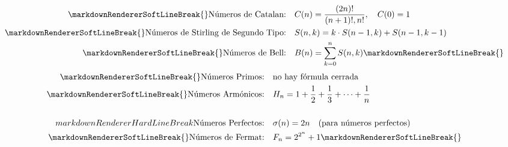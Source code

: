 {}
\markdownRendererSectionEnd \markdownRendererSectionBegin
{}\markdownRendererInterblockSeparator
{}\begin{align*}\markdownRendererSoftLineBreak
{}\text{Números de Catalan:} & \quad C(n) = \frac{(2n)!}{(n+1)! , n!}, \quad C(0)=1 \\\markdownRendererSoftLineBreak
{}\text{Números de Stirling de Segundo Tipo:} & \quad S(n, k) = k \cdot S(n-1, k) + S(n-1, k-1) \\\markdownRendererSoftLineBreak
{}\text{Números de Bell:} & \quad B(n) = \sum_{k=0}^{n} S(n, k)\markdownRendererSoftLineBreak
{}\end{align*}\markdownRendererInterblockSeparator
{}
\markdownRendererSectionEnd \markdownRendererSectionBegin
{}\markdownRendererInterblockSeparator
{}\begin{align*}\markdownRendererSoftLineBreak
{}\text{Números Primos:} & \quad \text{no hay fórmula cerrada} \\\markdownRendererSoftLineBreak
{}\text{Números Armónicos:} & \quad H_n = 1 + \frac{1}{2} + \frac{1}{3} + \dots + \frac{1}{n} \\\\markdownRendererHardLineBreak
{}\text{Números Perfectos:} & \quad \sigma(n) = 2n \quad (\text{para números perfectos}) \\\markdownRendererSoftLineBreak
{}\text{Números de Fermat:} & \quad F_n = 2^{2^n} + 1\markdownRendererSoftLineBreak
{}\end{align*}
\markdownRendererSectionEnd 
\markdownRendererSectionEnd \markdownRendererDocumentEnd